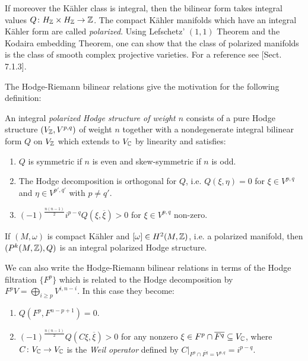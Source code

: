 \documentclass[../main.tex]{subfiles}
\begin{document}
If moreover the K\"{a}hler class is integral, then the bilinear form takes integral values $Q\colon H_{\mathbb{Z}} \times H_{\mathbb{Z}} \to \mathbb{Z}$. 
The compact K\"{a}hler manifolds which have an integral K\"{a}hler form are called \emph{polarized}. Using Lefschetz' $(1,1)$ Theorem and the Kodaira embedding Theorem, one can show that the class of polarized manifolds is the class of smooth complex projective varieties. For a reference see \cite{Voi07}[Sect. 7.1.3].

The Hodge-Riemann bilinear relations give the motivation for the following definition:

\begin{defn} An integral \emph{polarized Hodge structure of weight $n$} consists of a pure Hodge structure $(V_{\mathbb{Z}},V^{p,q})$ of weight $n$ together with a nondegenerate integral bilinear form $Q$ on $V_{\mathbb{Z}}$ which extends to $V_{\mathbb{C}}$ by linearity and satisfies:

\begin{enumerate}
\item $Q$ is symmetric if $n$ is even and skew-symmetric if $n$ is odd.
\item \label{2HdgRiem} The Hodge decomposition is orthogonal for $Q$, i.e. $Q(\xi,\eta) = 0$ for $\xi \in V^{p,q}$ and $\eta \in V^{p',q'}$ with $p \neq q'$.
\item \label{3HdgRiem} $(-1)^{\frac{n(n-1)}{2}} i^{p-q} Q(\xi,\overline{\xi}) > 0$ for $\xi \in V^{p,q}$ non-zero.
\end{enumerate}
\end{defn}

If $(M, \omega)$ is compact Kähler and $[\omega] \in H^2(M, \mathbb{Z})$, i.e. a polarized manifold, then $(P^k(M, \mathbb{Z}), Q)$ is an integral polarized Hodge structure.




\begin{rem} We can also write the Hodge-Riemann bilinear relations in terms of the Hodge filtration $\{F^p\}$ which is related to the Hodge decomposition by $F^p V = \bigoplus_{i \geq p} V^{i,n-i} $. In this case they become:
\begin{enumerate}[(1')]\addtocounter{enumi}{1}\setlength{\itemindent}{\parindent}
\item \label{2HdgRiemprime} $Q(F^p,F^{n-p+1}) = 0$.
\item \label{3HdgRiemprime} $(-1)^{\frac{n(n-1)}{2}} Q(C\xi,\overline{\xi}) > 0$ for any nonzero $\xi \in F^p \cap \overline{F^q} \subseteq V_{\mathbb{C}}$, where $C \colon V_{\mathbb{C}} \to V_{\mathbb{C}}$ is the \emph{Weil operator} defined by $C|_{F^p \cap \overline{F^q} =  V^{p,q}} = i^{p-q}$.
\end{enumerate}
\end{rem}
\end{document}
